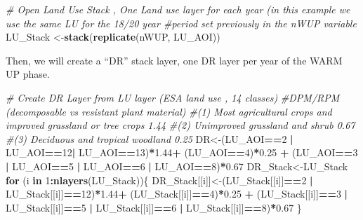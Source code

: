 \documentclass[
  10pt,
  b5paper,
]{book}
\newenvironment{Shaded}{\begin{snugshade}}{\end{snugshade}}
\newcommand{\CommentTok}[1]{\textcolor[rgb]{0.56,0.35,0.01}{\textit{#1}}}
\newcommand{\ControlFlowTok}[1]{\textcolor[rgb]{0.13,0.29,0.53}{\textbf{#1}}}
\newcommand{\DecValTok}[1]{\textcolor[rgb]{0.00,0.00,0.81}{#1}}
\newcommand{\FloatTok}[1]{\textcolor[rgb]{0.00,0.00,0.81}{#1}}
\newcommand{\KeywordTok}[1]{\textcolor[rgb]{0.13,0.29,0.53}{\textbf{#1}}}
\newcommand{\NormalTok}[1]{#1}
\newcommand{\OperatorTok}[1]{\textcolor[rgb]{0.81,0.36,0.00}{\textbf{#1}}}
\newcommand{\StringTok}[1]{\textcolor[rgb]{0.31,0.60,0.02}{#1}}
\begin{document}
\begin{Shaded}
\begin{Highlighting}[]
\CommentTok{# Open Land Use Stack , One Land use layer for each year (in this example we use the same LU for the 18/20 year #period set previously in the nWUP variable}
\NormalTok{ LU_Stack <-}\KeywordTok{stack}\NormalTok{(}\KeywordTok{replicate}\NormalTok{(nWUP, LU_AOI))}
\end{Highlighting}
\end{Shaded}

Then, we will create a ``DR'' stack layer, one DR layer per year of the WARM UP phase.

\begin{Shaded}
\begin{Highlighting}[]
\CommentTok{# Create DR Layer from LU layer (ESA land use , 14 classes)}
\CommentTok{#DPM/RPM (decomposable vs resistant plant material)}
\CommentTok{#(1) Most agricultural crops and improved grassland or tree crops 1.44 }
\CommentTok{#(2) Unimproved grassland and shrub 0.67}
\CommentTok{#(3) Deciduous and tropical woodland 0.25    }
\NormalTok{DR<-(LU_AOI}\OperatorTok{==}\DecValTok{2} \OperatorTok{|}\StringTok{ }\NormalTok{LU_AOI}\OperatorTok{==}\DecValTok{12}\OperatorTok{|}\StringTok{ }\NormalTok{LU_AOI}\OperatorTok{==}\DecValTok{13}\NormalTok{)}\OperatorTok{*}\FloatTok{1.44}\OperatorTok{+}\StringTok{ }\NormalTok{(LU_AOI}\OperatorTok{==}\DecValTok{4}\NormalTok{)}\OperatorTok{*}\FloatTok{0.25} \OperatorTok{+}\StringTok{ }\NormalTok{(LU_AOI}\OperatorTok{==}\DecValTok{3} \OperatorTok{|}\StringTok{ }\NormalTok{LU_AOI}\OperatorTok{==}\DecValTok{5} \OperatorTok{|}\StringTok{ }\NormalTok{LU_AOI}\OperatorTok{==}\DecValTok{6} \OperatorTok{|}\StringTok{ }\NormalTok{LU_AOI}\OperatorTok{==}\DecValTok{8}\NormalTok{)}\OperatorTok{*}\FloatTok{0.67}
\NormalTok{DR_Stack<-LU_Stack}
\ControlFlowTok{for}\NormalTok{ (i }\ControlFlowTok{in} \DecValTok{1}\OperatorTok{:}\KeywordTok{nlayers}\NormalTok{(LU_Stack))\{}
\NormalTok{DR_Stack[[i]]<-(LU_Stack[[i]]}\OperatorTok{==}\DecValTok{2} \OperatorTok{|}\StringTok{ }\NormalTok{LU_Stack[[i]]}\OperatorTok{==}\DecValTok{12}\NormalTok{)}\OperatorTok{*}\FloatTok{1.44}\OperatorTok{+}\StringTok{ }\NormalTok{(LU_Stack[[i]]}\OperatorTok{==}\DecValTok{4}\NormalTok{)}\OperatorTok{*}\FloatTok{0.25} \OperatorTok{+}\StringTok{ }\NormalTok{(LU_Stack[[i]]}\OperatorTok{==}\DecValTok{3} \OperatorTok{|}\StringTok{ }\NormalTok{LU_Stack[[i]]}\OperatorTok{==}\DecValTok{5} \OperatorTok{|}\StringTok{ }\NormalTok{LU_Stack[[i]]}\OperatorTok{==}\DecValTok{6} \OperatorTok{|}\StringTok{ }\NormalTok{LU_Stack[[i]]}\OperatorTok{==}\DecValTok{8}\NormalTok{)}\OperatorTok{*}\FloatTok{0.67}
\NormalTok{\}}
\end{Highlighting}
\end{Shaded}
\end{document}
